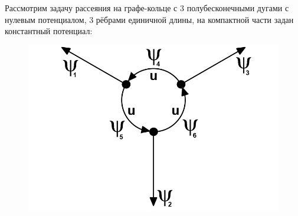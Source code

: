 \documentclass[a4 paper, 12 pt]{extarticle}
\begin{document}
   Рассмотрим задачу рассеяния на графе-кольце с 3 полубесконечными дугами с нулевым потенциалом, 3 рёбрами единичной длины, на компактной части задан константный потенциал:
   \begin{figure}[h]
   	\centering
   	\includegraphics[scale=0.5]{arrow_graph.jpg}
   \end{figure}
   
\end{document}
